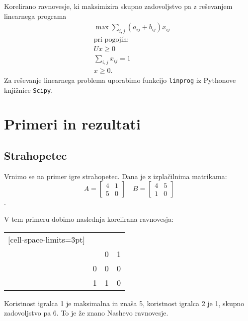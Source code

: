 \documentclass{article}
\begin{document}
Korelirano ravnovesje, ki maksimizira skupno zadovoljstvo pa z reševanjem linearnega programa
    \begin{align*}
        &\max \sum_{i,j} (a_{ij} + b_{ij}) x_{ij} \\
        &\text{pri pogojih:} \\
        & U x \geq 0 \\
        & \sum_{i,j} x_{ij} = 1  \\
        & x \geq 0.
    \end{align*}
Za reševanje linearnega problema uporabimo funkcijo \texttt{linprog} iz Pythonove knjižnice \texttt{Scipy}. 

\section{Primeri in rezultati}
\subsection[]{Strahopetec}
Vrnimo se na primer igre strahopetec. Dana je z izplačilnima matrikama:
\[
A = \begin{bmatrix}
    4  & 1 \\
    5 & 0
\end{bmatrix}
\quad
B = \begin{bmatrix}
    4 & 5   \\
    1 & 0 
\end{bmatrix}
\].

V tem primeru dobimo naslednja korelirana ravnovesja: 

\noindent
\begin{minipage}[t]{0.2\textwidth}
    \begin{NiceTabular}{cccc}[cell-space-limits=3pt]
        &     &  \\
        &     & 0     & 1 \\
        & 0 & 
                0 & 0 \\
        & 1 & 1 & 0
    \end{NiceTabular}
\end{minipage}%
\hfill
\begin{minipage}[t]{0.7\textwidth}
    Koristnost igralca 1 je maksimalna in znaša 5, koristnost igralca 2 je 1, skupno zadovoljstvo pa 6. To je že znano Nashevo ravnovesje.
\end{minipage}
\vspace{0.5cm} 
\end{document}
